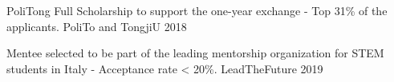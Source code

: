 
\begin{cvhonors}

  \cvhonor
    {PoliTong Full Scholarship} %
    {to support the one-year exchange - Top 31\% of the applicants.} %
    {PoliTo and TongjiU} %
    {2018} %
    
  \cvhonor
    {Mentee} %
    {selected to be part of the leading mentorship organization for STEM students in Italy - Acceptance rate < 20\%.} %
    {LeadTheFuture} %
    {2019} %

\end{cvhonors}
